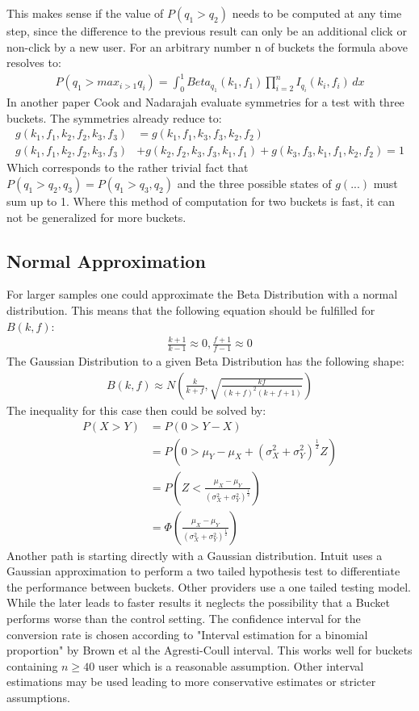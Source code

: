 \documentclass[../Thesis.tex]{subfiles}
\begin{document}
This makes sense if the value of $P(q_1>q_2)$ needs to be computed at any time step, since the difference to the previous result can only be an additional click or non-click by a new user.
For an arbitrary number n of buckets the formula above resolves to:
\begin{align*}
P(q_1> max_{i>1}q_i)=\int_{0}^{1}Beta_{q_1}(k_1,f_1) \prod_{i=2}^{n} I_{q_i}(k_i,f_i)\,dx
\end{align*}
In another paper \cite{cook2006stochastic} Cook and Nadarajah evaluate symmetries for a test with three buckets. The symmetries already reduce to:
\begin{align*}
g(k_1,f_1,k_2,f_2,k_3,f_3) &= g(k_1,f_1,k_3,f_3,k_2,f_2) \\
g(k_1,f_1,k_2,f_2,k_3,f_3) &+ g(k_2,f_2,k_3,f_3,k_1,f_1) + g(k_3,f_3,k_1,f_1,k_2,f_2) = 1
\end{align*}
Which corresponds to the rather trivial fact that $P(q_1>q_2,q_3) = P(q_1>q_3,q_2)$ and the three possible states of $g(...)$ must sum up to 1. Where this method of computation for two buckets is fast, it can not be generalized for more buckets. 

\subsection{Normal Approximation}
For larger samples one could approximate the Beta Distribution with a normal distribution. This means that the following equation should be fulfilled for $B(k,f)$:
\begin{align*}
\frac{k + 1}{k - 1}\approx 0,
\frac{f + 1}{f - 1}\approx 0
\end{align*}
The Gaussian Distribution to a given Beta Distribution has the following shape:
\begin{align*}
B(k,f)\approx N\left(\frac{k}{k+f},\sqrt{\frac{kf}{(k+f)^2(k+f+1)}} \right)
\end{align*}
The inequality for this case then could be solved by:
\begin{align*}
P(X>Y)	&= P(0 > Y - X) \\
			&= P(0 > \mu_Y - \mu_X + (\sigma_X^2 + \sigma_Y^2)^{\frac{1}{2}}Z) \\
			&= P\left(Z < \frac{\mu_X - \mu_Y}{(\sigma_X^2 + \sigma_Y^2)^{\frac{1}{2}}}\right) \\
			&= \Phi\left(\frac{\mu_X - \mu_Y}{(\sigma_X^2 + \sigma_Y^2)^{\frac{1}{2}}}\right)
\end{align*}
Another path is starting directly with a Gaussian distribution. Intuit uses a Gaussian approximation to perform a two tailed hypothesis test to differentiate the performance between buckets. Other providers use a one tailed testing model. While the later leads to faster results it neglects the possibility that a Bucket performs worse than the control setting.
The confidence interval for the conversion rate is chosen according to "Interval estimation for a binomial proportion" by Brown et al \cite{brown2001interval} the Agresti-Coull interval. This works well for buckets containing $n \geq 40$ user which is a reasonable assumption. Other interval estimations may be used leading to more conservative estimates or stricter assumptions.
\end{document}
